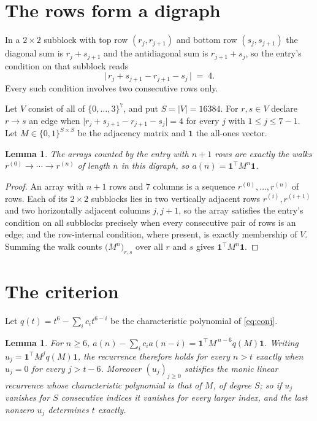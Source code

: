 \documentclass[11pt,a4paper]{article}
\theoremstyle{plain}
\newtheorem{lemma}[theorem]{Lemma}
\theoremstyle{definition}
\begin{document}
\section{The rows form a digraph}

In a $2\times2$ subblock with top row $(r_j,r_{j+1})$ and bottom row $(s_j,s_{j+1})$ the
diagonal sum is $r_j+s_{j+1}$ and the antidiagonal sum is $r_{j+1}+s_j$, so the entry's
condition on that subblock reads
\[
\bigl|\,r_j+s_{j+1}-r_{j+1}-s_j\,\bigr|\;=\;4.
\]
Every such condition involves two consecutive rows only.

Let $V$ consist of all of $\{0,\dots,3\}^{7}$, and put $S=|V|=16384$. For $r,s\in V$ declare $r\to s$ an edge
when $\bigl|r_j+s_{j+1}-r_{j+1}-s_j\bigr|=4$ for every $j$ with
$1\le j\le7-1$. Let $M\in\{0,1\}^{S\times S}$ be the adjacency matrix and $\mathbf{1}$
the all-ones vector.

\begin{lemma}\label{lem:walk}
The arrays counted by the entry with $n+1$ rows are exactly the walks
$r^{(0)}\to\cdots\to r^{(n)}$ of length $n$ in this digraph, so
$a(n)=\mathbf{1}^{\!\top}M^{n}\mathbf{1}$.
\end{lemma}

\begin{proof}
An array with $n+1$ rows and $7$ columns is a sequence $r^{(0)},\dots,r^{(n)}$ of
rows. Each of its $2\times2$ subblocks lies in two vertically adjacent rows
$r^{(i)},r^{(i+1)}$ and two horizontally adjacent columns $j,j+1$, so the array satisfies
the entry's condition on all subblocks precisely when every consecutive pair of rows is an
edge; and the row-internal condition, where present, is exactly membership of $V$. Summing
the walk counts $\bigl(M^{n}\bigr)_{r,s}$ over all $r$ and $s$ gives
$\mathbf{1}^{\!\top}M^{n}\mathbf{1}$.
\end{proof}

\section{The criterion}

Let $q(t)=t^{6}-\sum_i c_i t^{6-i}$ be the characteristic polynomial of
\eqref{eq:conj}.

\begin{lemma}\label{lem:crit}
For $n\ge6$,
$a(n)-\sum_i c_i a(n-i)=\mathbf{1}^{\!\top}M^{\,n-6}q(M)\mathbf{1}$. Writing
$u_j=\mathbf{1}^{\!\top}M^{j}q(M)\mathbf{1}$, the recurrence therefore holds for every
$n>t$ exactly when $u_j=0$ for every $j>t-6$. Moreover $(u_j)_{j\ge0}$ satisfies the
monic linear recurrence whose characteristic polynomial is that of $M$, of degree $S$; so
if $u_j$ vanishes for $S$ consecutive indices it vanishes for every larger index, and the
last nonzero $u_j$ determines $t$ exactly.
\end{lemma}
\end{document}
